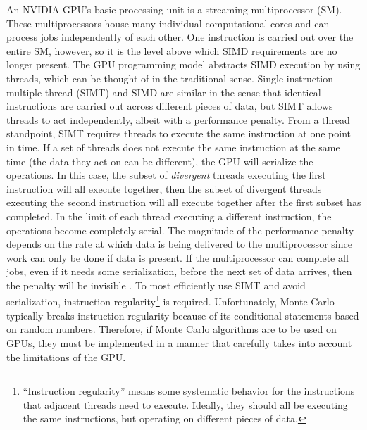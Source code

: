 \documentclass[preprint,12pt]{elsarticle}
\begin{document}
An NVIDIA GPU's basic processing unit is a streaming multiprocessor (SM).  These multiprocessors house many individual computational cores and can process jobs independently of each other.  One instruction is carried out over the entire SM, however, so it is the level above which SIMD requirements are no longer present.  The GPU programming model abstracts SIMD execution by using threads, which can be thought of in the traditional sense.  Single-instruction multiple-thread (SIMT) and SIMD are similar in the sense that identical instructions are carried out across different pieces of data, but SIMT allows threads to act independently, albeit with a performance penalty.  From a thread standpoint, SIMT requires threads to execute the same instruction at one point in time.  If a set of threads does not execute the same instruction at the same time (the data they act on can be different), the GPU will serialize the operations.  In this case, the subset of \emph{divergent} threads executing the first instruction will all execute together, then the subset of divergent threads executing the second instruction will all execute together after the first subset has completed.  In the limit of each thread executing a different instruction, the operations become completely serial.  The magnitude of the performance penalty depends on the rate at which data is being delivered to the multiprocessor since work can only be done if data is present.  If the multiprocessor can complete all jobs, even if it needs some serialization, before the next set of data arrives, then the penalty will be invisible \cite{cuda}.  To most efficiently use SIMT and avoid serialization, instruction regularity\footnote{``Instruction regularity'' means some systematic behavior for the instructions that adjacent threads need to execute.  Ideally, they should all be executing the same instructions, but operating on different pieces of data.} is required.  Unfortunately, Monte Carlo typically breaks instruction regularity because of its conditional statements based on random numbers.  Therefore, if Monte Carlo algorithms are to be used on GPUs, they must be implemented in a manner that carefully takes into account the limitations of the GPU.  
\end{document}
